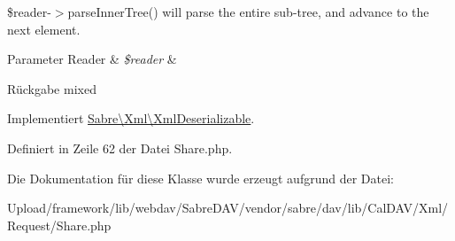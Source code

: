 \$reader-\/$>$parse\+Inner\+Tree() will parse the entire sub-\/tree, and advance to the next element.


\begin{DoxyParams}[1]{Parameter}
Reader & {\em \$reader} & \\
\hline
\end{DoxyParams}
\begin{DoxyReturn}{Rückgabe}
mixed 
\end{DoxyReturn}


Implementiert \mbox{\hyperlink{interface_sabre_1_1_xml_1_1_xml_deserializable_a19e0eca545b9a0d93f7d6b69085ade30}{Sabre\textbackslash{}\+Xml\textbackslash{}\+Xml\+Deserializable}}.



Definiert in Zeile 62 der Datei Share.\+php.



Die Dokumentation für diese Klasse wurde erzeugt aufgrund der Datei\+:\begin{DoxyCompactItemize}
\item 
Upload/framework/lib/webdav/\+Sabre\+D\+A\+V/vendor/sabre/dav/lib/\+Cal\+D\+A\+V/\+Xml/\+Request/Share.\+php\end{DoxyCompactItemize}
